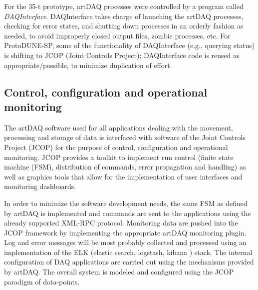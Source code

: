  
For the 35-t prototype, artDAQ processes were controlled by a program called
\textit{DAQInterface}. DAQInterface takes 
charge of launching the artDAQ processes, checking for error states, and
shutting down
 processes in an orderly fashion as needed, to avoid improperly closed output files,
zombie processes, etc. For ProtoDUNE-SP, some of the functionality of DAQInterface (e.g., querying  status) is shifting to JCOP (Joint Controls Project);
DAQInterface code is reused as appropriate/possible, to minimize duplication of effort. 



\subsection{Control, configuration and operational monitoring}

The artDAQ software used for all applications dealing with the movement,
processing and storage of data is interfaced with software of the
Joint Controls Project (JCOP) for the purpose of control, configuration
and operational monitoring.  JCOP provides a toolkit to implement run
control (finite state machine (FSM), distribution of commands, error
propagation and handling) as well as graphics tools that allow for the
implementation of user interfaces and monitoring dashboards.  

In order to
minimize the software development needs, the same FSM as defined by artDAQ
is implemented and commands are sent to the applications using
the already supported XML-RPC protocol.  Monitoring data are pushed
into the JCOP framework by implementing the appropriate artDAQ monitoring
plugin.  Log and error messages will be most probably collected and
processed using an implementation of the ELK (elastic search, logstash,
kibana \cite{elastic:kibana}) stack. 
 The internal configuration of DAQ applications are
carried out using the mechanisms provided by artDAQ. The overall system
is modeled and configured using the JCOP paradigm of data-points.


